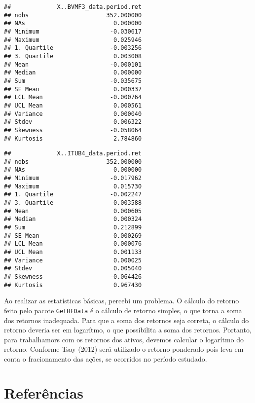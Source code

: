 \documentclass[]{article}
\newenvironment{Shaded}{\begin{snugshade}}{\end{snugshade}}
\newcommand{\KeywordTok}[1]{\textcolor[rgb]{0.13,0.29,0.53}{\textbf{{#1}}}}
\newcommand{\NormalTok}[1]{{#1}}
\begin{document}
\begin{verbatim}
##             X..BVMF3_data.period.ret
## nobs                      352.000000
## NAs                         0.000000
## Minimum                    -0.030617
## Maximum                     0.025946
## 1. Quartile                -0.003256
## 3. Quartile                 0.003008
## Mean                       -0.000101
## Median                      0.000000
## Sum                        -0.035675
## SE Mean                     0.000337
## LCL Mean                   -0.000764
## UCL Mean                    0.000561
## Variance                    0.000040
## Stdev                       0.006322
## Skewness                   -0.058064
## Kurtosis                    2.784860
\end{verbatim}

\begin{Shaded}
\end{Shaded}

\begin{verbatim}
##             X..ITUB4_data.period.ret
## nobs                      352.000000
## NAs                         0.000000
## Minimum                    -0.017962
## Maximum                     0.015730
## 1. Quartile                -0.002247
## 3. Quartile                 0.003588
## Mean                        0.000605
## Median                      0.000324
## Sum                         0.212899
## SE Mean                     0.000269
## LCL Mean                    0.000076
## UCL Mean                    0.001133
## Variance                    0.000025
## Stdev                       0.005040
## Skewness                   -0.064426
## Kurtosis                    0.967430
\end{verbatim}

Ao realizar as estatísticas básicas, percebi um problema. O cálculo do
retorno feito pelo pacote \texttt{GetHFData} é o cálculo de retorno
simples, o que torna a soma dos retornos inadequada. Para que a soma dos
retornos seja correta, o cálculo do retorno deveria ser em logarítmo, o
que possibilita a soma dos retornos. Portanto, para trabalhamors com os
retornos dos ativos, devemos calcular o logarítmo do retorno. Conforme
Tsay (2012) será utilizado o retorno ponderado pois leva em conta o
fracionamento das ações, se ocorridos no período estudado.

\section*{Referências}\label{referencias}
\end{document}

